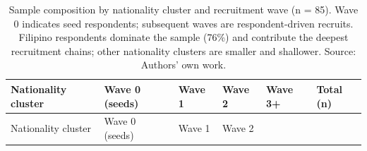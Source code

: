 \documentclass[
  12pt,
  letterpaper,
  DIV=11,
  numbers=noendperiod]{scrartcl}
\begin{document}
\begin{longtable}[]{@{}
  >{\raggedright\arraybackslash}p{}
  >{\raggedleft\arraybackslash}p{}
  >{\raggedleft\arraybackslash}p{}
  >{\raggedleft\arraybackslash}p{}
  >{\raggedleft\arraybackslash}p{}
  >{\raggedleft\arraybackslash}p{}@{}}
\caption{Sample composition by nationality cluster and recruitment wave
(n = 85). Wave 0 indicates seed respondents; subsequent waves are
respondent-driven recruits. Filipino respondents dominate the sample
(76\%) and contribute the deepest recruitment chains; other nationality
clusters are smaller and shallower. Source: Authors' own
work.}\label{tbl-sample-chars}\tabularnewline
\toprule\noalign{}
\begin{minipage}[b]{\linewidth}\raggedright
Nationality cluster
\end{minipage} & \begin{minipage}[b]{\linewidth}\raggedleft
Wave 0 (seeds)
\end{minipage} & \begin{minipage}[b]{\linewidth}\raggedleft
Wave 1
\end{minipage} & \begin{minipage}[b]{\linewidth}\raggedleft
Wave 2
\end{minipage} & \begin{minipage}[b]{\linewidth}\raggedleft
Wave 3+
\end{minipage} & \begin{minipage}[b]{\linewidth}\raggedleft
Total (n)
\end{minipage} \\
\midrule\noalign{}
\endfirsthead
\toprule\noalign{}
\begin{minipage}[b]{\linewidth}\raggedright
Nationality cluster
\end{minipage} & \begin{minipage}[b]{\linewidth}\raggedleft
Wave 0 (seeds)
\end{minipage} & \begin{minipage}[b]{\linewidth}\raggedleft
Wave 1
\end{minipage} & \begin{minipage}[b]{\linewidth}\raggedleft
Wave 2
\end{minipage} & \begin{minipage}[b]{\linewidth}\raggedleft

\end{minipage}
\end{longtable}
\end{document}

